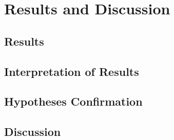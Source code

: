 \chapter{Results and Discussion}
\label{chap:kapitel5}

	\section{Results}
	\label{sec:results}



	\section{Interpretation of Results}
	\label{sec:interpretation-of-results}
	
	
	
	\section{Hypotheses Confirmation}
	\label{sec:hypotheses-conformation}
	
	
	
	\section{Discussion} %
	\label{sec:doscussion}
	
	
	








